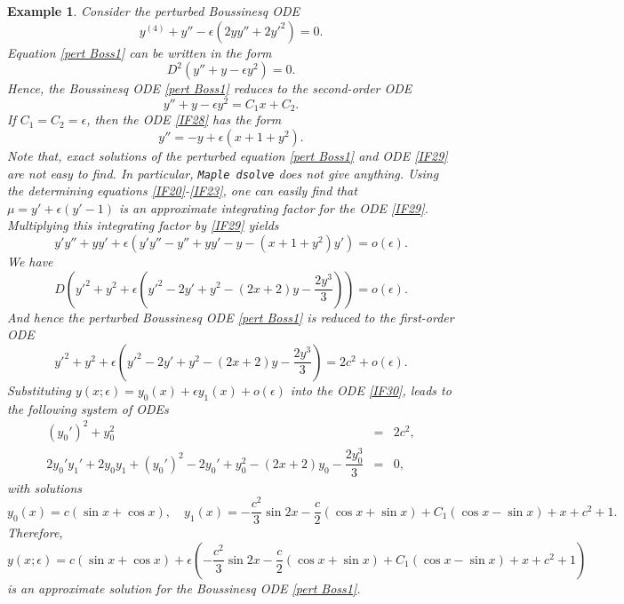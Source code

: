 \documentclass[11pt,letter,subeqn]{article}
\newtheorem{example}{Example}[section]
\begin{document}
\begin{example}
Consider the perturbed Boussinesq ODE
   \begin{equation}\label{pert Boss1}
  y^{(4)}+y''-\epsilon \left(2yy''+2y'^2\right)=0.
  \end{equation}
  Equation \eqref{pert Boss1} can be written in the form
  \[
    D^2(y''+y-\epsilon {y}^2)=0.
  \]
  Hence, the Boussinesq ODE \eqref{pert Boss1} reduces to the second-order ODE
  \begin{equation}\label{IF28}
    y''+y-\epsilon {y}^2=C_1x+C_2.
  \end{equation}
  If $C_1=C_2=\epsilon$, then the ODE \eqref{IF28} has the form
  \begin{equation}\label{IF29}
    y''=-y+\epsilon(x+1+y^2).
  \end{equation}
  Note that, exact solutions of the perturbed equation \eqref{pert Boss1} and ODE \eqref{IF29} are not easy to find. In particular, \verb"Maple dsolve" does not give anything. Using the determining equations \eqref{IF20}-\eqref{IF23}, one can easily find that $\mu=y'+\epsilon(y'-1)$ is an approximate integrating factor for the ODE \eqref{IF29}. Multiplying this integrating factor by \eqref{IF29} yields
  \[
    y'y''+yy'+\epsilon(y'y''-y''+yy'-y-(x+1+y^2)y')=o(\epsilon).
  \]
 We have
  \[
     D\left(y'^2+y^2+\epsilon \left(y'^2-2y'+y^2-(2x+2)y-\dfrac{2y^3}{3}\right)\right)=o(\epsilon).
  \]
  And hence the perturbed Boussinesq ODE \eqref{pert Boss1} is reduced to the first-order ODE
  \begin{equation}\label{IF30}
    y'^2+y^2+\epsilon \left(y'^2-2y'+y^2-(2x+2)y-\dfrac{2y^3}{3}\right)=2c^2+o(\epsilon).
  \end{equation}
  Substituting $y(x;\epsilon)=y_0(x)+\epsilon y_1(x)+o(\epsilon)$ into the ODE \eqref{IF30}, leads to the following system of ODEs
  \begin{eqnarray}
    (y_0')^2+y_0^2 &=& 2c^2, \\
    2y_0'y_1'+2y_0y_1+(y_0')^2-2y_0'+y_0^2-(2x+2)y_0-\dfrac{2y_0^3}{3} &=& 0,
  \end{eqnarray}
 with solutions
 \[
   y_0(x)=c\left(\sin x +\cos x\right),\quad y_1(x)=-\dfrac{c^2 }{3}\sin 2x-\dfrac{c}{2}\left(\cos x+\sin x\right)+C_1\left(\cos x-\sin x\right)+x+c^2+1.
 \]
 Therefore,
 \begin{equation}\label{}
   y(x;\epsilon)=c(\sin x +\cos x)+\epsilon \left(-\dfrac{c^2 }{3}\sin 2x-\dfrac{c}{2}(\cos x + \sin x)+C_1(\cos x - \sin x)+x+c^2+1\right)
 \end{equation}
 is an approximate solution for the Boussinesq ODE \eqref{pert Boss1}.
\end{example}
\end{document}
